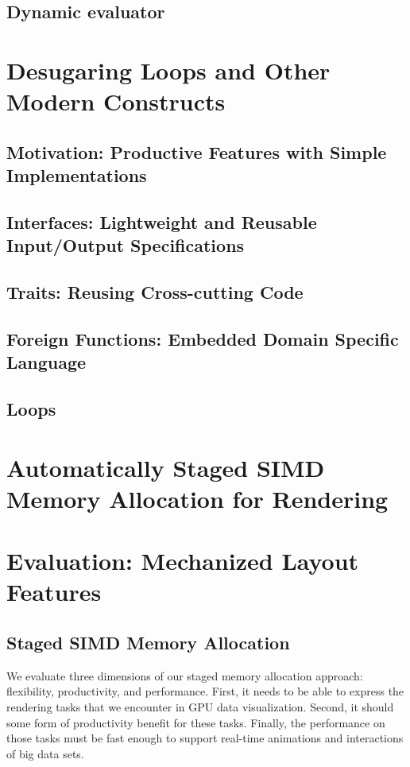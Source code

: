 \subsection{Dynamic evaluator}

\section{Desugaring Loops and Other Modern Constructs}
\subsection{Motivation: Productive Features with Simple Implementations}
\subsection{Interfaces: Lightweight and Reusable Input/Output Specifications}
\subsection{Traits: Reusing Cross-cutting Code}
\subsection{Foreign Functions: Embedded Domain Specific Language}
\subsection{Loops}


\section{Automatically Staged SIMD Memory Allocation for Rendering}




\section{Evaluation: Mechanized Layout Features}


\subsection{Staged SIMD Memory Allocation}
We evaluate three dimensions of our staged memory allocation approach: flexibility, productivity, and performance. First, it needs to be able to express the rendering tasks that we encounter in GPU data visualization. Second, it should some form of productivity benefit for these tasks. Finally, the performance on those tasks must be fast  enough to support real-time animations and interactions of big data sets.

